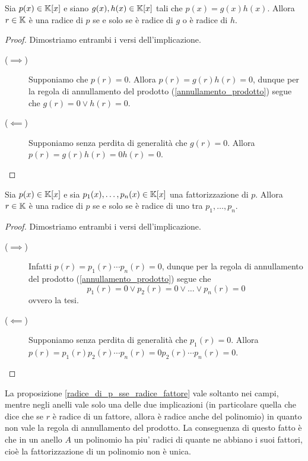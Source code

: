 \begin{proposition}\label{radice_di_p_sse_radice_fattore}
    Sia $p(x) \in \mathbb{K}[x]$ e siano $g(x), h(x) \in \mathbb{K}[x]$ tali che $p(x) = g(x)h(x)$. Allora $r \in \mathbb{K}$ è una radice di $p$ se e solo se è radice di $g$ o è radice di $h$.
\end{proposition}
\begin{proof}
    Dimostriamo entrambi i versi dell'implicazione.
    \begin{description}
        \item[($\implies$)] Supponiamo che $p(r) = 0$. Allora $p(r) = g(r)h(r) = 0$, dunque per la regola di annullamento del prodotto (\ref{annullamento_prodotto}) segue che $g(r) = 0 \lor h(r) = 0$.
        \item[($\impliedby$)] Supponiamo senza perdita di generalità che $g(r) = 0$. Allora $p(r) = g(r)h(r) = 0h(r) = 0$. \qedhere 
    \end{description}
\end{proof}
\begin{corollary}
    Sia $p(x) \in \mathbb{K}[x]$ e sia $p_1(x), \dots, p_n(x) \in \mathbb{K}[x]$ una fattorizzazione di $p$. Allora $r \in \mathbb{K}$ è una radice di $p$ se e solo se è radice di uno tra $p_1, \dots, p_n$.
\end{corollary}
\begin{proof}
    Dimostriamo entrambi i versi dell'implicazione.
    \begin{description}
        \item[($\implies$)] Infatti $p(r) = p_1(r) \cdots p_n(r) = 0$, dunque per la regola di annullamento del prodotto (\ref{annullamento_prodotto}) segue che \[
            p_1(r) = 0 \lor p_2(r) = 0 \lor \dots \lor p_n(r) = 0    
        \] ovvero la tesi.
        \item[($\impliedby$)] Supponiamo senza perdita di generalità che $p_1(r) = 0$. Allora $p(r) = p_1(r)p_2(r)\cdots p_n(r) = 0p_2(r)\cdots p_n(r) = 0$. \qedhere
    \end{description} 
\end{proof}

\begin{remark}
    La proposizione \ref{radice_di_p_sse_radice_fattore} vale soltanto nei campi, mentre negli anelli vale solo una delle due implicazioni (in particolare quella che dice che se $r$ è radice di un fattore, allora è radice anche del polinomio) in quanto non vale la regola di annullamento del prodotto. La conseguenza di questo fatto è che in un anello $A$ un polinomio ha piu' radici di quante ne abbiano i suoi fattori, cioè la fattorizzazione di un polinomio non è unica.
\end{remark}

